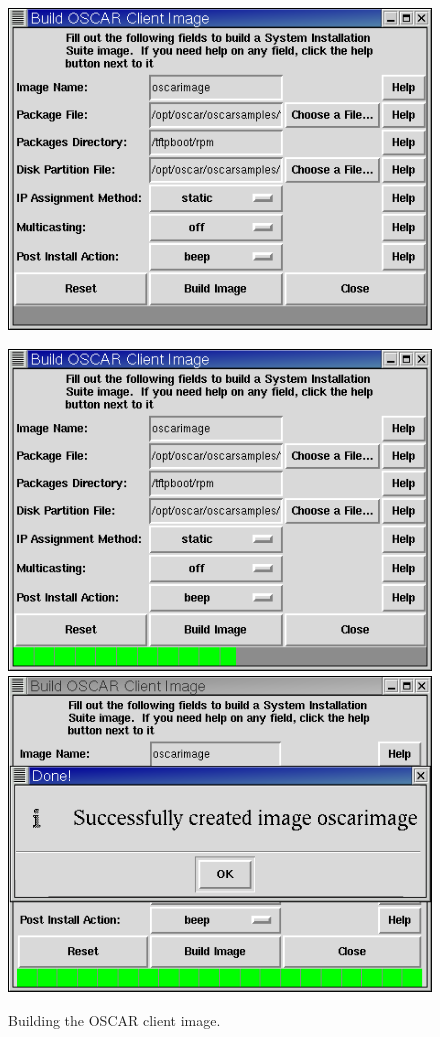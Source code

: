 \begin{figure}[h!]
  \begin{center}
    \centerline{\includegraphics[scale=\imgscale]{figs/4a_sbs-build-image1}}
    \vspace{\imgvskip}
    \centerline{
      \includegraphics[scale=\imgscale]{figs/4b_sbs-build-image2}
      \hspace{\imghskip}
      \includegraphics[scale=\imgscale]{figs/4c_sbs-build-image3}
      }
    \caption{Building the OSCAR client image.}
    \label{fig:sbs-build-image}
  \end{center}
\end{figure}



